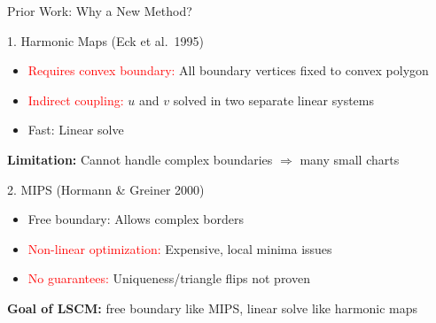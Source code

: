 \documentclass[aspectratio=169]{beamer}
\begin{document}
\begin{frame}{Prior Work: Why a New Method?}

\begin{block}{1. Harmonic Maps (Eck et al.\ 1995)}
\begin{itemize}
  \item \textcolor{red}{Requires convex boundary:} All boundary vertices fixed to convex polygon
  \item \textcolor{red}{Indirect coupling:} $u$ and $v$ solved in two separate linear systems
  \item \textcolor{green!50!black}{Fast:} Linear solve
\end{itemize}
\textbf{Limitation:} Cannot handle complex boundaries $\Rightarrow$ many small charts
\end{block}

\vspace{0.3em}

\begin{block}{2. MIPS (Hormann \& Greiner 2000)}
\begin{itemize}
  \item \textcolor{green!50!black}{Free boundary:} Allows complex borders
  \item \textcolor{red}{Non-linear optimization:} Expensive, local minima issues
  \item \textcolor{red}{No guarantees:} Uniqueness/triangle flips not proven
\end{itemize}
\end{block}

\vspace{0.3em}
\textbf{Goal of LSCM:} free boundary like MIPS, \alert{linear solve} like harmonic maps

\end{frame}
\end{document}
